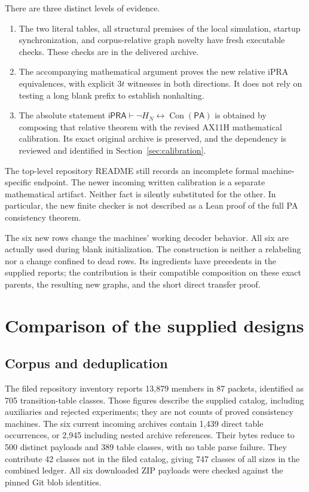\documentclass[11pt,letterpaper]{article}
\newcommand{\ipra}{\mathsf{iPRA}}
\newcommand{\PA}{\mathsf{PA}}
\newcommand{\Con}{\operatorname{Con}}
\newcommand{\file}[1]{\path{#1}}
\begin{document}
There are three distinct levels of evidence.
\begin{enumerate}
\item The two literal tables, all structural premises of the local simulation,
      startup synchronization, and corpus-relative graph novelty have fresh
      executable checks. These checks are in the delivered archive.
\item The accompanying mathematical argument proves the new relative iPRA
      equivalences, with explicit $3t$ witnesses in both directions. It does
      not rely on testing a long blank prefix to establish nonhalting.
\item The absolute statement $\ipra\vdash\neg H_N\leftrightarrow\Con(\PA)$
      is obtained by composing that relative theorem with the revised
      AX11H mathematical calibration. Its exact original archive is preserved,
      and the dependency is reviewed and identified in Section~\ref{sec:calibration}.
\end{enumerate}
The top-level repository README still records an incomplete formal
machine-specific endpoint. The newer incoming written calibration is a
separate mathematical artifact. Neither fact is silently substituted for
the other. In particular, the new finite checker is not described as a
Lean proof of the full PA consistency theorem.

The six new rows change the machines' working decoder behavior. All six
are actually used during blank initialization. The construction is neither
a relabeling nor a change confined to dead rows. Its ingredients have
precedents in the supplied reports; the contribution is their compatible
composition on these exact parents, the resulting new graphs, and the
short direct transfer proof.

\section{Comparison of the supplied designs}\label{sec:comparison}

\subsection{Corpus and deduplication}

The filed repository inventory reports 13,879 \file{*.tm} members in 87
packets, identified as 705 transition-table classes. Those figures describe
the supplied catalog, including auxiliaries and rejected experiments;
they are not counts of proved consistency machines.\cite{catalog} The six current
incoming archives contain 1,439 direct table occurrences, or 2,945 including
nested archive references. Their bytes reduce to 500 distinct payloads and
389 table classes, with no table parse failure. They contribute 42 classes
not in the filed catalog, giving 747 classes of all sizes in the combined
ledger. All six downloaded ZIP payloads were checked against the pinned
Git blob identities.
\end{document}
